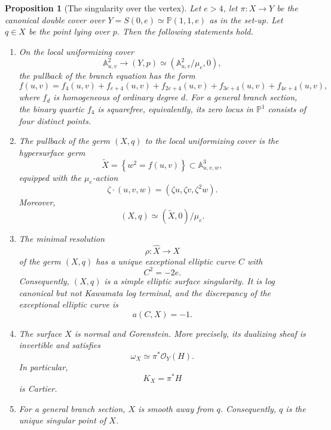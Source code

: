 \documentclass[11pt,twoside]{amsart}
\theoremstyle{plain}
\numberwithin{equation}{section}
\newtheorem{proposition}[theorem]{Proposition}
\theoremstyle{definition}
\begin{document}
\begin{proposition}[The singularity over the vertex]
\label{thm:singularity-canonical-double-cover-cone}
Let $e>4$, let $\pi:X\longrightarrow Y$
be the canonical double cover over $Y=S(0,e)\simeq \mathbb{P}(1,1,e)$ as in the set-up. Let $q\in X$ be the point lying over $p$. Then the following statements hold.

\begin{enumerate}
    \item On the local uniformizing cover
    $$
    \mathbb{A}^2_{u,v}
    \longrightarrow
    (Y,p)
    \simeq
    \left(
    \mathbb{A}^2_{u,v}/\mu_e,0
    \right),
    $$
    the pullback of the branch equation has the form
    $$
    f(u,v)
    =
    f_4(u,v)
    +
    f_{e+4}(u,v)
    +
    f_{2e+4}(u,v)
    +
    f_{3e+4}(u,v)
    +
    f_{4e+4}(u,v),
    $$
    where $f_d$ is homogeneous of ordinary degree $d$. For a general branch section, the binary quartic $f_4$ is squarefree, equivalently, its zero locus in $\mathbb{P}^1$ consists of four distinct points.

    \item The pullback of the germ $(X,q)$ to the local uniformizing cover is the hypersurface germ
    $$
    \widetilde X
    =
    \left\{
    w^2=f(u,v)
    \right\}
    \subset
    \mathbb{A}^3_{u,v,w},
    $$
    equipped with the $\mu_e$-action
    $$
    \zeta\cdot(u,v,w)
    =
    (\zeta u,\zeta v,\zeta^2w).
    $$
    Moreover,
    $$
    (X,q)
    \simeq
    (\widetilde X,0)/\mu_e.
    $$
   \item The minimal resolution
    $$
    \rho:\widehat X\longrightarrow X
    $$
    of the germ $(X,q)$ has a unique exceptional elliptic curve $C$ with
    $$
    C^2=-2e.
    $$
    Consequently, $(X,q)$ is a simple elliptic surface singularity. It is log canonical but not Kawamata log terminal, and the discrepancy of the exceptional elliptic curve is
    $$
    a(C,X)=-1.
    $$

    \item The surface $X$ is normal and Gorenstein. More precisely, its dualizing sheaf is invertible and satisfies
    $$
    \omega_X
    \simeq
    \pi^*\mathcal{O}_Y(H).
    $$
    In particular,
    $$
    K_X=\pi^*H
    $$
    is Cartier.
    \item For a general branch section, $X$ is smooth away from $q$. Consequently, $q$ is the unique singular point of $X$.
    \end{enumerate}
\end{proposition}
\end{document}
